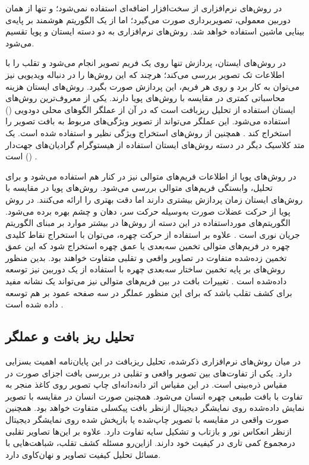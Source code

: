 در روش‌های نرم‌افزاری از سخت‌افزار اضافه‌ای استفاده نمی‌شود؛ و تنها از همان دوربین معمولی، تصویربرداری صورت می‌گیرد؛ اما از یک الگوریتم هوشمند بر پایه‌ی بینایی ماشین استفاده خواهد شد. روش‌های نرم‌افزاری به دو دسته ایستان و پویا تقسیم می‌شود.

در روش‌های ایستان، پردازش تنها روی یک فریم تصویر انجام می‌شود و تقلب را با اطلاعات تک تصویر بررسی می‌کند؛ هر‌چند که این روش‌ها را در دنباله ویدیویی نیز می‌توان به کار برد و روی هر فریم، این پردازش صورت بگیرد. روش‌های ایستان هزینه محاسباتی کمتری در مقایسه با روش‌های پویا دارند.  
یکی از معروف‌ترین روش‌های ایستان استفاده از تحلیل ریز‌بافت
 است که در آن از عملگر الگو‌های محلی دودویی 
 () 
 استفاده می‌شود. این عملگر می‌تواند از تصویر ویژگی‌های مربوط به بافت تصویر را استخراج کند
 \cite{maatta2011face,chingovska2012effectiveness}.
 همچنین از روش‌های استخراج ویژگی نظیر 
  \cite{7487030}
 و 
  \cite{7748511}
 استفاده شده است.
 یک متد کلاسیک دیگر در دسته روش‌های ایستان استفاده از هیستوگرام گرادیان‌های جهت‌دار
 () 
 است
 \cite{schwartz2011face,komulainen2013context,yang2013face}.

در روش‌های پویا از اطلاعات فریم‌های متوالی نیز در کنار هم استفاده می‌شود و برای تحلیل، وابستگی فریم‌های متوالی بررسی می‌شود. روش‌های پویا در مقایسه با روش‌های ایستان زمان پردازش بیشتری دارند اما دقت بهتری را ارائه می‌کنند. 
در روش پویا از حرکت عضلات صورت به‌وسیله حرکت سر، دهان و چشم بهره برده می‌شود. الگوریتم‌های مورد‌استفاده در این دسته از روش‌ها در بیشتر موارد بر مبنای الگوریتم جریان نوری 
است
\cite{yin2016face, anjos2014motion}.
علاوه بر استفاده از حرکت چهره، می‌توان با استخراج نقاط کلیدی چهره در فریم‌های متوالی تخمین سه‌بعدی یا عمق چهره استخراج شود که این عمق تخمین زده‌شده متفاوت در تصاویر واقعی و تقلبی متفاوت خواهند بود. بدین منظور روش‌های بر پایه تخمین ساختار سه‌بعدی چهره با استفاده از یک دوربین نیز توسعه داده‌شده است
\cite{wang2013face,de2012moving}.
 تغییرات بافت در بین فریم‌های متوالی نیز می‌تواند یک نشانه مفید برای کشف تقلب باشد که برای این منظور عملگر 
در سه صفحه عمود بر هم توسعه داده شده است
\cite{freitas2012lbp}.
\subsection{تحلیل ریز بافت و عملگر }
در میان روش‌های نرم‌افزاری ذکر‌شده، تحلیل ریزبافت در این پایان‌نامه اهمیت بسزایی دارد. یکی از تفاوت‌های بین تصویر واقعی و تقلبی در بررسی بافت اجزای صورت در مقیاس ذره‌بینی
 است. در این مقیاس اثر دانه‌دانه‌ای چاپ تصویر روی کاغذ منجر به تفاوت با بافت طبیعی چهره انسان  می‌شود. همچنین صورت انسان در مقایسه با تصویر نمایش داده‌شده روی نمایشگر دیجیتال از‌نظر بافت پیکسلی متفاوت خواهد بود. همچنین صورت واقعی در مقایسه با تصویر چاپ‌شده یا بازپخش  شده روی نمایشگر دیجیتال از‌نظر انعکاس نور و بازتاب و تشکیل سایه تفاوت دارد. علاوه بر این‌ها تصاویر تقلبی در‌مجموع کمی تاری در کیفیت خود دارند. از‌این‌رو مسئله کشف تقلب، شباهت‌هایی با مسائل تحلیل کیفیت تصاویر و نهان‌کاوی دارد.

